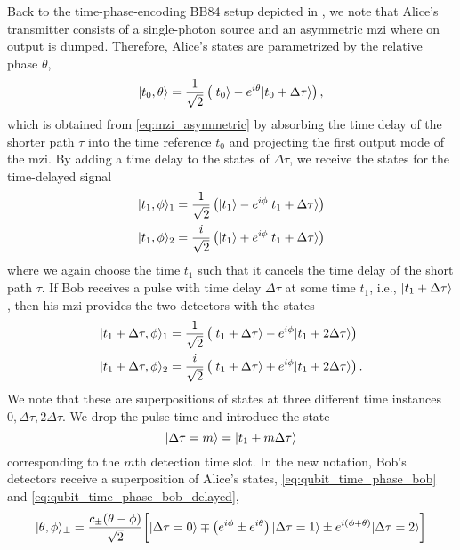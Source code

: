 Back to the time-phase-encoding BB84 setup depicted in , we note that Alice's transmitter consists of a single-photon source and an asymmetric \gls{mzi} where on output is dumped.
Therefore, Alice's states are parametrized by the relative phase $\theta$,
\begin{equation}
	\lvert t_0,\theta\rangle
	=
	\frac{1}{\sqrt{2}}
	\left(
		\lvert t_0\rangle
		-
		e^{i\theta}
		\lvert t_0+\Delta\tau\rangle
	\right)
	,
\end{equation}
which is obtained from \cref{eq:mzi_asymmetric} by absorbing the time delay of the shorter path $\tau$ into the time reference $t_0$ and projecting the first output mode of the \gls{mzi}.
By adding a time delay to the states of $\Delta\tau$, we receive the states for the time-delayed signal
\begin{align}
	\lvert t_1,\phi\rangle_1
	&=
	\frac{1}{\sqrt{2}}
	\left(
		\lvert t_1\rangle
		-
		e^{i\phi}
		\lvert t_1+\Delta\tau\rangle
	\right)
	\\
	\lvert t_1,\phi\rangle_2
	&=
	\frac{i}{\sqrt{2}}
	\left(
		\lvert t_1\rangle
		+
		e^{i\phi}
		\lvert t_1+\Delta\tau\rangle
	\right)
	\label{eq:qubit_time_phase_bob_nodelay}
\end{align}
where we again choose the time $t_1$ such that it cancels the time delay of the short path $\tau$.
If Bob receives a pulse with time delay $\Delta\tau$ at some time $t_1$, i.e., $\lvert t_1+\Delta\tau\rangle$, then his \gls{mzi} provides the two detectors with the states
\begin{align}
	\lvert t_1+\Delta\tau,\phi\rangle_1
	&=
	\frac{1}{\sqrt{2}}
	\left(
		\lvert t_1+\Delta\tau\rangle
		-
		e^{i\phi}
		\lvert t_1+2\Delta\tau\rangle
	\right)
	\\
	\lvert t_1+\Delta\tau,\phi\rangle_2
	&=
	\frac{i}{\sqrt{2}}
	\left(
		\lvert t_1+\Delta\tau\rangle
		+
		e^{i\phi}
		\lvert t_1+2\Delta\tau\rangle
	\right)
	.
	\label{eq:qubit_time_phase_bob}
\end{align}
We note that these are superpositions of states at three different time instances $0,\Delta\tau,2\Delta\tau$.
We drop the pulse time and introduce the state
\begin{equation}
	\lvert\Delta\tau=m\rangle
	=
	\lvert t_1+m\Delta\tau\rangle
\end{equation}
corresponding to the $m$th detection time slot.
In the new notation, Bob's detectors receive a superposition of Alice's states, \cref{eq:qubit_time_phase_bob} and \cref{eq:qubit_time_phase_bob_delayed},
\begin{equation}
	\lvert\theta,\phi\rangle_\pm
	=
	\frac{c_\pm(\theta-\phi)}{\sqrt{2}}
	\biggl[
		\lvert\Delta\tau=0\rangle
		\mp
		\left(
			e^{i\phi}
			\pm
			e^{i\theta}
		\right)
		\lvert\Delta\tau=1\rangle
		\pm
		e^{i(\phi+\theta)}
		\lvert\Delta\tau=2\rangle
	\biggr]
	\label{eq:qubit_time_phase_bob_delayed}
\end{equation}
